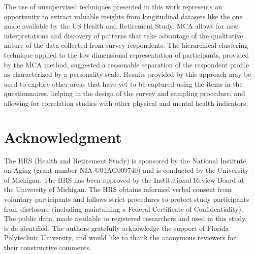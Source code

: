 \documentclass[conference,final,]{IEEEtran}
\begin{document}
The use of unsupervised techniques presented in this work represents an
opportunity to extract valuable insights from longitudinal datasets like
the one made available by the US Health and Retirement Study. MCA allows
for new interpretations and discovery of patterns that take advantage of
the qualitative nature of the data collected from survey respondents.
The hierarchical clustering technique applied to the low dimensional
representation of participants, provided by the MCA method, suggested a
reasonable separation of the respondent profile as characterized by a
personality scale. Results provided by this approach may be used to
explore other areas that have yet to be captured using the items in the
questionnaires, helping in the design of the survey and sampling
procedure, and allowing for correlation studies with other physical and
mental health indicators.

\hypertarget{acknowledgment}{%
\section*{Acknowledgment}\label{acknowledgment}}

The HRS (Health and Retirement Study) is sponsored by the National
Institute on Aging (grant number NIA U01AG009740) and is conducted by
the University of Michigan. The HRS has been approved by the
Institutional Review Board at the University of Michigan. The HRS
obtains informed verbal consent from voluntary participants and follows
strict procedures to protect study participants from disclosure
(including maintaining a Federal Certificate of Confidentiality). The
public data, made available to registered researchers and used in this
study, is de-identified. The authors gratefully acknowledge the support
of Florida Polytechnic University, and would like to thank the anonymous
reviewers for their constructive comments.




\end{document}

